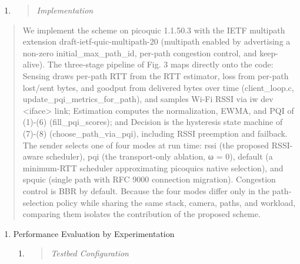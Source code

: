 \begin{enumerate}
\def\labelenumi{\arabic{enumi}.}
\setcounter{enumi}{4}
\item
  \begin{quote}
  \emph{Implementation}
  \end{quote}
\end{enumerate}

\begin{quote}
We implement the scheme on picoquic 1.1.50.3 with the IETF multipath extension draft-ietf-quic-multipath-20 (multipath enabled by advertising a non-zero initial\_max\_path\_id, per-path congestion control, and keep-alive). The three-stage pipeline of Fig. 3 maps directly onto the code: Sensing draws per-path RTT from the RTT estimator, loss from per-path lost/sent bytes, and goodput from delivered bytes over time (client\_loop.c, update\_pqi\_metrics\_for\_path), and samples Wi-Fi RSSI via iw dev \textless iface\textgreater{} link; Estimation computes the normalization, EWMA, and PQI of (1)-(6) (fill\_pqi\_scores); and Decision is the hysteresis state machine of (7)-(8) (choose\_path\_via\_pqi), including RSSI preemption and failback. The sender selects one of four modes at run time: rssi (the proposed RSSI-aware scheduler), pqi (the transport-only ablation, ω = 0), default (a minimum-RTT scheduler approximating picoquic\textquotesingle s native selection), and spquic (single path with RFC 9000 connection migration). Congestion control is BBR by default. Because the four modes differ only in the path-selection policy while sharing the same stack, camera, paths, and workload, comparing them isolates the contribution of the proposed scheme.
\end{quote}

\begin{enumerate}
\def\labelenumi{\arabic{enumi}.}
\setcounter{enumi}{3}
\item
  Performance Evaluation by Experimentation

  \begin{enumerate}
  \def\labelenumii{\arabic{enumii}.}
  \item
    \begin{quote}
    \emph{Testbed Configuration}
    \end{quote}
  \end{enumerate}
\end{enumerate}

